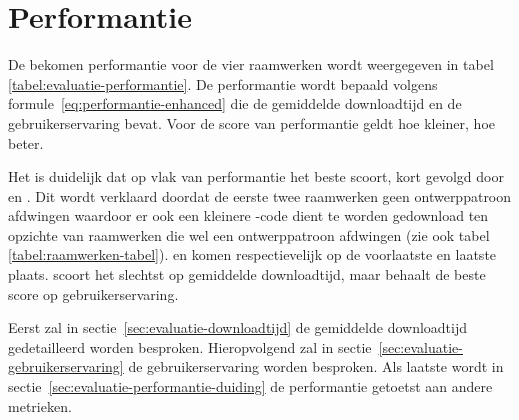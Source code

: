 \section{Performantie}
\label{sec:evaluatie-performantie}

De bekomen performantie voor de vier raamwerken wordt weergegeven in tabel \ref{tabel:evaluatie-performantie}.
De performantie wordt bepaald volgens formule~\ref{eq:performantie-enhanced} die de gemiddelde downloadtijd en de gebruikerservaring bevat.
Voor de score van performantie geldt hoe kleiner, hoe beter.

\begin{table}
\centering
{}
\caption{Overzicht van performantie.}
\label{tabel:evaluatie-performantie}
\end{table}

Het is duidelijk dat op vlak van performantie \lungo{} het beste scoort, kort gevolgd door \jqm{} en \st{}.
Dit wordt verklaard doordat de eerste twee raamwerken geen ontwerppatroon afdwingen waardoor er ook een kleinere \js{}-code dient te worden gedownload ten opzichte van raamwerken die wel een ontwerppatroon afdwingen (zie ook tabel \ref{tabel:raamwerken-tabel}).
\kendo{} en \st{} komen respectievelijk op de voorlaatste en laatste plaats.
\st{} scoort het slechtst op gemiddelde downloadtijd, maar behaalt de beste score op gebruikerservaring.

Eerst zal in sectie~\ref{sec:evaluatie-downloadtijd} de gemiddelde downloadtijd gedetailleerd worden besproken.
Hieropvolgend zal in sectie~\ref{sec:evaluatie-gebruikerservaring} de gebruikerservaring worden besproken.
Als laatste wordt in sectie~\ref{sec:evaluatie-performantie-duiding} de performantie getoetst aan andere metrieken.


